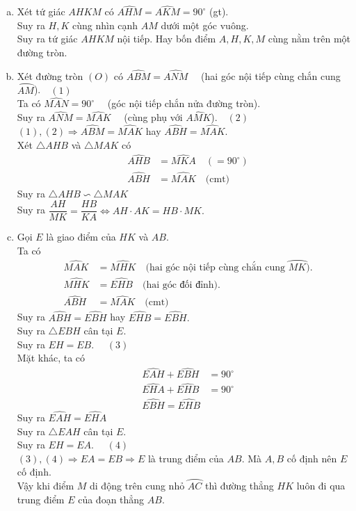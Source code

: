 \begin{bt}
{\begin{enumerate}[a)]
\item  Xét tứ giác $AHKM$ có $\widehat{AHM} =\widehat{AKM} =90^{\circ}$ (gt).\\
Suy ra $H,K$ cùng nhìn cạnh $AM$ dưới một góc vuông.\\
Suy ra tứ giác $AHKM$ nội tiếp. Hay bốn điểm $A,H,K,M$ cùng nằm trên một đường tròn.
\item Xét đường tròn $(O)$ có $\widehat{ABM}= \widehat{ANM}\quad$ (hai góc nội tiếp cùng chắn cung $\wideparen{AM}$).$\quad (1)$\\
Ta có $\widehat{MAN}=90^{\circ}\quad$ (góc nội tiếp chắn nửa đường tròn).\\
Suy ra $\widehat{ANM}=\widehat{MAK} \quad$  (cùng phụ với $\widehat{AMK}$).$\quad (2)$\\
$(1),(2) \Rightarrow \widehat{ABM}=\widehat{MAK}$ hay $\widehat{ABH}=\widehat{MAK}$.\\
Xét $\triangle AHB$ và $\triangle MAK$ có
\begin{eqnarray*}
&\widehat{AHB}&=\widehat{MKA} \quad (=90^{\circ})\\
&\widehat{ABH}&=\widehat{MAK} \quad \text{(cmt)}
\end{eqnarray*}
Suy ra $\triangle AHB \backsim \triangle MAK \quad $ \\
Suy ra $\dfrac{AH}{MK}=\dfrac{HB}{KA} \Leftrightarrow AH\cdot AK=HB \cdot MK.$
\item Gọi $E$ là giao điểm của $HK$ và $AB$.\\
Ta có 
\begin{eqnarray*}
&\widehat{MAK} &= \widehat{MHK} \quad \text{(hai góc nội tiếp cùng chắn cung } \wideparen{MK}).\\
&\widehat{MHK} &= \widehat{EHB}\quad \text{(hai góc đối đỉnh).}\\
&\widehat{ABH}&=\widehat{MAK} \quad \text{(cmt)}
\end{eqnarray*} 
Suy ra $\widehat{ABH} =\widehat{EBH}$ hay $\widehat{EHB} =\widehat{EBH}.$\\
Suy ra $\triangle EBH$ cân tại $E$.\\
Suy ra $EH=EB.$ $\quad (3)$\\
Mặt khác, ta có 
\begin{eqnarray*}
&\widehat{EAH} + \widehat{EBH} &= 90^{\circ}\\
&\widehat{EHA} + \widehat{EHB} &= 90^{\circ}\\
&\widehat{EBH}=\widehat{EHB} &
\end{eqnarray*} 
Suy ra $\widehat{EAH} =\widehat{EHA}$ \\
Suy ra $\triangle EAH$ cân tại $E$.\\
Suy ra $EH=EA.$ $\quad (4)$\\
$(3),(4) \Rightarrow EA=EB \Rightarrow E$ là trung điểm của $AB$. Mà $A,B$ cố định nên $E$ cố định.\\
Vậy khi điểm $M$ di động trên cung nhỏ $\wideparen{AC}$ thì đường thẳng $HK$ luôn đi qua trung điểm $E$ của đoạn thẳng $AB$.
\end{enumerate}
}
\end{bt}


